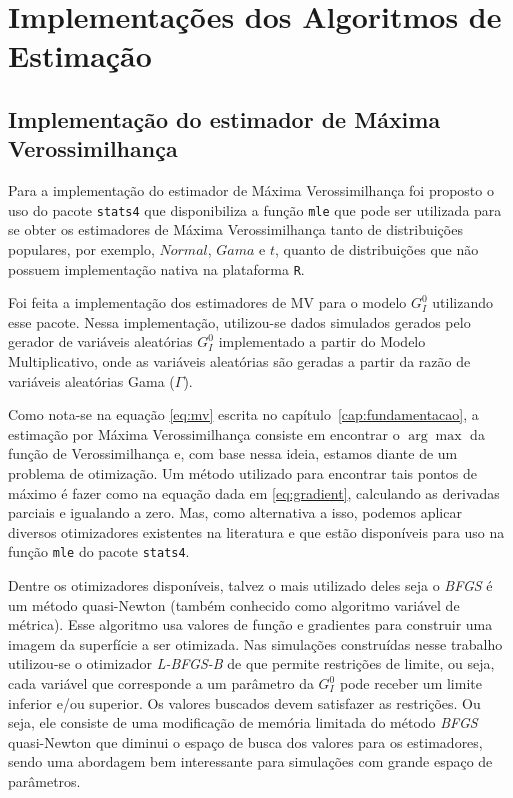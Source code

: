 \section{Implementações dos Algoritmos de Estimação}

\subsection{Implementação do estimador de Máxima Verossimilhança}

Para a implementação do estimador de Máxima Verossimilhança foi proposto o uso do pacote \texttt{stats4} que disponibiliza a função \texttt{mle} que pode ser utilizada para se obter os estimadores de Máxima Verossimilhança tanto de distribuições populares, por exemplo, $Normal$, $Gama$ e $t$, quanto de distribuições que não possuem implementação nativa na plataforma \texttt{R}.

Foi feita a implementação dos estimadores de MV para o modelo $G_I^0$ utilizando esse pacote. Nessa implementação, utilizou-se dados simulados gerados pelo gerador de variáveis aleatórias $G_I^0$ implementado a partir do Modelo Multiplicativo, onde as variáveis aleatórias são geradas a partir da razão de variáveis aleatórias Gama ($\Gamma$).

Como nota-se na equação \eqref{eq:mv} escrita no capítulo~\ref{cap:fundamentacao}, a estimação por Máxima Verossimilhança consiste em encontrar o $\arg\max$ da função de Verossimilhança e, com base nessa ideia, estamos diante de um problema de otimização. Um método utilizado para encontrar tais pontos de máximo é fazer como na equação dada em \eqref{eq:gradient}, calculando as derivadas parciais e igualando a zero. Mas, como alternativa a isso, podemos aplicar diversos otimizadores existentes na literatura e que estão disponíveis para uso na função \texttt{mle} do pacote \texttt{stats4}.

Dentre os otimizadores disponíveis, talvez o mais utilizado deles seja o \emph{BFGS} é um método quasi-Newton (também conhecido como algoritmo variável de métrica).  Esse algoritmo usa valores de função e gradientes para construir uma imagem da superfície a ser otimizada. Nas simulações construídas nesse trabalho utilizou-se o otimizador \emph{L-BFGS-B} de \citet{Byrd_1995} que permite restrições de limite, ou seja, cada variável que corresponde a um parâmetro da $G_I^0$ pode receber um limite inferior e/ou superior. Os valores buscados devem satisfazer as restrições. Ou seja, ele consiste de uma modificação de memória limitada do método \emph{BFGS} quasi-Newton que diminui o espaço de busca dos valores para os estimadores, sendo uma abordagem bem interessante para simulações com grande espaço de parâmetros.

